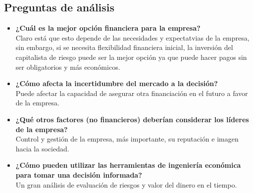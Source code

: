 \documentclass[letterpaper,12pt]{article}
\begin{document}
\begin{sloppypar}
\subsection*{Preguntas de análisis}
\begin{itemize}
    \item \textbf{¿Cuál es la mejor opción financiera para la empresa?} \\ Claro está que esto depende de las necesidades y expectatvias de la empresa, sin embargo, si se necesita flexibilidad financiera inicial, la inversión del capitalista de riesgo puede ser la mejor opción ya que puede hacer pagos sin ser obligatorios y más económicos.
    \item \textbf{¿Cómo afecta la incertidumbre del mercado a la decisión?} \\ Puede afectar la capacidad de asegurar otra financiación en el futuro a favor de la empresa.
    \item \textbf{¿Qué otros factores (no financieros) deberían considerar los líderes de la empresa?}\\ Control y gestión de la empresa, más importante, su reputación e imagen hacia la sociedad.
    \item \textbf{¿Cómo pueden utilizar las herramientas de ingeniería económica para tomar una decisión informada? } \\ Un gran análisis de evaluación de riesgos y valor del dinero en el tiempo.
\end{itemize}


\end{sloppypar}
\end{document}
